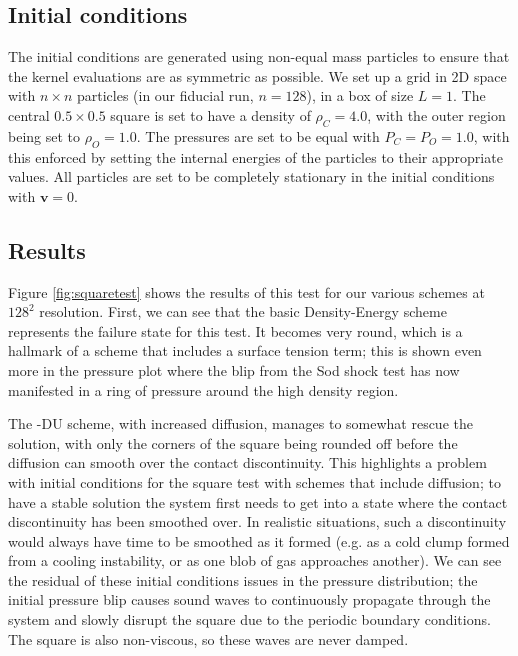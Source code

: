 \subsection{Initial conditions}

The initial conditions are generated using non-equal mass particles to ensure
that the kernel evaluations are as symmetric as possible. We set up a grid in
2D space with $n\times n$ particles (in our fiducial run, $n=128$), in a box
of size $L=1$. The central $0.5 \times 0.5$ square is set to have a density
of $\rho_C = 4.0$, with the outer region being set to $\rho_O = 1.0$. The
pressures are set to be equal with $P_C = P_O = 1.0$, with this enforced by
setting the internal energies of the particles to their appropriate values.
All particles are set to be completely stationary in the initial conditions
with $\mathbf{v} = 0$.

\subsection{Results}


Figure \ref{fig:squaretest} shows the results of this test for our various
schemes at $128^2$ resolution. First, we can see that the basic
Density-Energy scheme represents the failure state for this test. It becomes
very round, which is a hallmark of a scheme that includes a surface tension
term; this is shown even more in the pressure plot where the blip from the
Sod shock test has now manifested in a ring of pressure around the high
density region.

The \anarchy{}-DU scheme, with increased diffusion, manages to somewhat rescue
the solution, with only the corners of the square being rounded off before
the diffusion can smooth over the contact discontinuity. This highlights a
problem with initial conditions for the square test with schemes that include
diffusion; to have a stable solution the system first needs to get into a
state where the contact discontinuity has been smoothed over. In realistic
situations, such a discontinuity would always have time to be smoothed as it
formed (e.g. as a cold clump formed from a cooling instability, or as one
blob of gas approaches another). We can see the residual of these initial conditions
issues in the pressure distribution; the initial pressure blip causes sound waves
to continuously propagate through the system and slowly disrupt the square
due to the periodic boundary conditions. The square is also non-viscous, 
so these waves are never damped.

